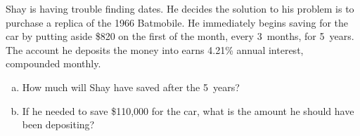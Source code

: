 \documentclass[11pt,letterpaper]{article}
\begin{document}
\newpage



 Shay is having trouble finding dates. He decides the solution to his problem is to purchase a replica of the 1966 Batmobile. He immediately begins saving for the car by putting aside \$820 on the first of the month, every 3~months, for 5~years. The account he deposits the money into earns 4.21\% annual interest, compounded monthly. 
	\begin{enumerate}[(a)]
	\item How much will Shay have saved after the 5~years?
	\item If he needed to save \$110,000 for the car, what is the amount he should have been depositing? 
	\end{enumerate}
\end{document}
